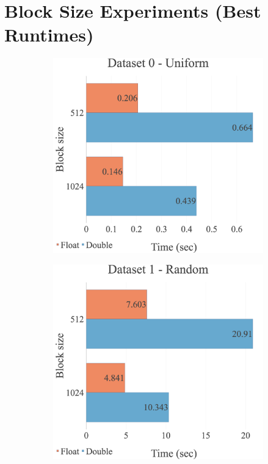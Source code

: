\section{Block Size Experiments (Best Runtimes)}
\label{appendix:option:block}
\begin{figure}[H]
\begin{adjustwidth}{-2cm}{-2cm}
\centering
\begin{subfigure}{.62\textwidth}
    \centering
    \includegraphics[width=1\textwidth]{img/experiments/multi-blocks-0_UNIFORM.png}
\end{subfigure}
\begin{subfigure}{.62\textwidth}
    \centering
    \includegraphics[width=1\textwidth]{img/experiments/multi-blocks-1_RAND.png}

\end{subfigure}
\end{adjustwidth}
\end{figure}
